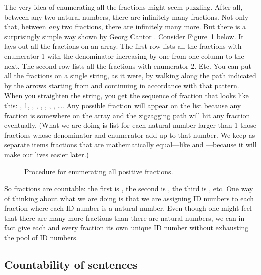 The very idea of enumerating all the fractions might seem puzzling.  After all, 
between any two natural numbers, there are infinitely many fractions. Not only 
that, between \emph{any} two fractions, there are infinitely many more.  But 
there is a surprisingly simple way shown by Georg Cantor  
\citeyearpar{Cantor1895}.  Consider Figure~\ref{fig:fractions} below.  It lays 
out all the fractions on an array.  The first row lists all the fractions with 
enumerator 1 with the denominator increasing by one from one column to the next.  
The second row lists all the fractions with enumerator 2.  Etc. You can put all 
the fractions on a single string, as it were, by walking along the path 
indicated by the arrows starting from  and continuing in 
accordance with that pattern.  When you straighten the string, you get the 
sequence of fraction that looks like this: , 
{1}, , , , , 
, , \ldots. Any possible fraction will appear on 
the list because any fraction is somewhere on the array and the zigzagging path 
will hit any fraction eventually. (What we are doing is list for each natural 
number larger than 1  those fractions whose denominator and enumerator add up to 
that number. We keep as separate items fractions that are mathematically 
equal---like  and ---because it will make our 
lives easier later.)

\begin{figure}[h!]
 \begin{center}
  
\caption{Procedure for enumerating all positive fractions.}
\label{fig:fractions}
 \end{center}
\end{figure}

So fractions are countable: the first is , the second is 
, the third is , etc.  One way of thinking about 
what we are doing is that we are assigning ID numbers to each fraction where 
each ID number is a natural number.  Even though one might feel that there are 
many more fractions than there are natural numbers, we can in fact give each and 
every fraction its own unique ID number without exhausting the pool of ID 
numbers.



\subsection{Countability of sentences}


